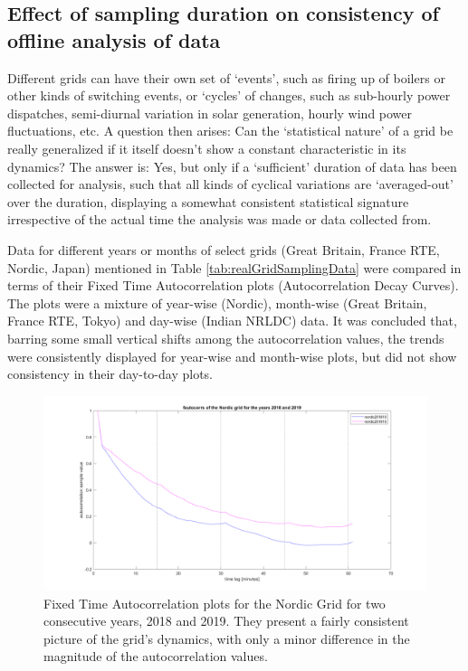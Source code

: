 \subsection*{Effect of sampling duration on consistency of offline analysis of data}
\label{app:effectOfSamplingDuration}

Different grids can have their own set of `events', such as firing up of boilers or other kinds of switching events, or `cycles' of changes, such as sub-hourly power dispatches, semi-diurnal variation in solar generation, hourly wind power fluctuations, etc. A question then arises: Can the `statistical nature' of a grid be really generalized if it itself doesn't show a constant characteristic in its dynamics? The answer is: Yes, but only if a `sufficient' duration of data has been collected for analysis, such that all kinds of cyclical variations are `averaged-out' over the duration, displaying a somewhat consistent statistical signature irrespective of the actual time the analysis was made or data collected from.

Data for different years or months of select grids (Great Britain, France RTE, Nordic, Japan) mentioned in Table \ref{tab:realGridSamplingData} were compared in terms of their Fixed Time Autocorrelation plots (Autocorrelation Decay Curves). The plots were a mixture of year-wise (Nordic), month-wise (Great Britain, France RTE, Tokyo) and day-wise (Indian NRLDC) data. It was concluded that, barring some small vertical shifts among the autocorrelation values, the trends were consistently displayed for year-wise and month-wise plots, but did not show consistency in their day-to-day plots. 

\begin{figure}[!ht]
	\includegraphics[scale=0.25]{../figures/autocorr/fautocorrs_nordic_201801_to_201912}
	\caption{Fixed Time Autocorrelation plots for the Nordic Grid for two consecutive years, 2018 and 2019. They present a fairly consistent picture of the grid's dynamics, with only a minor difference in the magnitude of the autocorrelation values.}
\end{figure}


